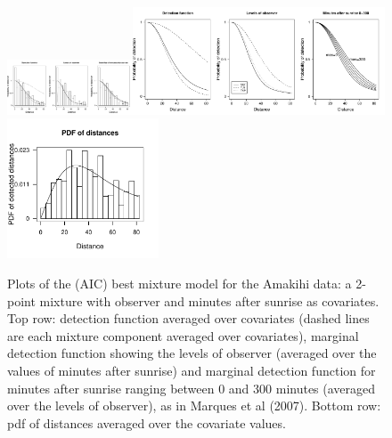 \documentclass{report}
\begin{document}
\begin{figure}[H]
\centering
\includegraphics[width=0.3333\textwidth, trim=0 0 7.133334in 0, clip=true]{analyses/amakihi-om.pdf}\includegraphics[width=0.6666\textwidth, trim=3.566667in 0 0 0, clip=true]{analyses/amakihi-om-hh.pdf}\\
\includegraphics[width=0.4\textwidth]{analyses/amakihi-om-pdf.pdf}
\caption{Plots of the (AIC) best mixture model for the Amakihi data: a 2-point mixture with observer and minutes after sunrise as covariates. Top row: detection function averaged over covariates (dashed lines are each mixture component averaged over covariates), marginal detection function showing the levels of observer (averaged over the values of minutes after sunrise) and marginal detection function for minutes after sunrise ranging between 0 and 300 minutes (averaged over the levels of observer), as in Marques et al (2007). Bottom row: pdf of distances averaged over the covariate values.}
\label{amakihi}
\end{figure}
\end{document}
